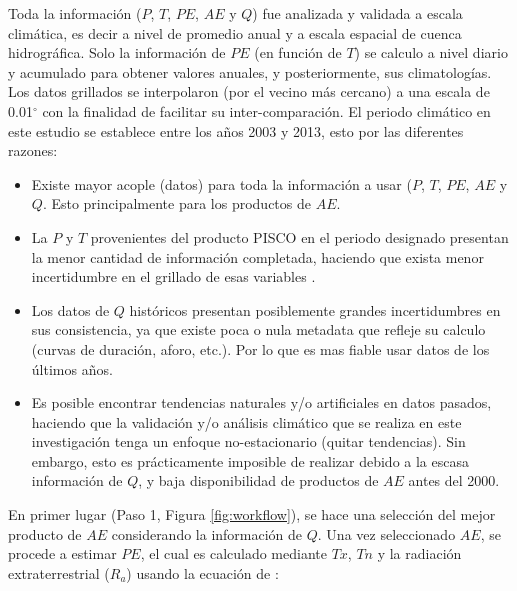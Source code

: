 \documentclass[12pt]{article}
\begin{document}


\thispagestyle{empty}

Toda la información ($P$, $T$, $PE$, $AE$ y $Q$) fue analizada y validada a escala climática, es decir a nivel de promedio anual y a escala espacial de cuenca hidrográfica. Solo la información de $PE$ (en función de $T$) se calculo a nivel diario y acumulado para obtener valores anuales, y posteriormente, sus climatologías. Los datos grillados se interpolaron (por el vecino más cercano) a una escala de 0.01$^{\circ}$ con la finalidad de facilitar su inter-comparación. El periodo climático en este estudio se establece entre los años 2003 y 2013, esto por las diferentes razones:

\begin{itemize}

	\item Existe mayor acople (datos) para toda la información a usar ($P$, $T$, $PE$, $AE$ y $Q$. Esto principalmente para los productos de $AE$.
	
	\item La $P$ y $T$ provenientes del producto PISCO en el periodo designado presentan la menor cantidad de información completada, haciendo que exista menor incertidumbre en el grillado de esas variables \citep{Huerta2019,Aybar2019}.
	
	\item Los datos de $Q$ históricos presentan posiblemente grandes incertidumbres en sus consistencia, ya que existe poca o nula metadata que refleje su calculo (curvas de duración, aforo, etc.). Por lo que es mas fiable usar datos de los últimos años.
	
	\item Es posible encontrar tendencias naturales y/o artificiales en datos pasados, haciendo que la validación y/o análisis climático que se realiza en este investigación tenga un enfoque no-estacionario (quitar tendencias). Sin embargo, esto es prácticamente imposible de realizar debido a la escasa información de $Q$, y baja disponibilidad de productos de $AE$ antes del 2000.
	
\end{itemize}

En primer lugar (Paso 1, Figura \ref{fig:workflow}), se hace una selección del mejor producto de $AE$ considerando la información de $Q$. Una vez seleccionado $AE$, se procede a estimar $PE$, el cual es calculado mediante $Tx$, $Tn$ y la radiación extraterrestrial ($R_{a}$) usando la ecuación de \citet{Hargreaves1985}:
\end{document}
